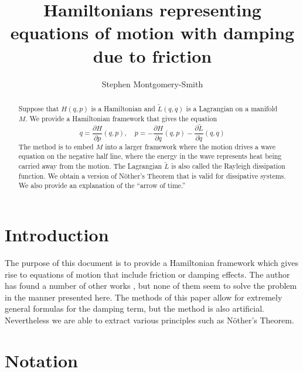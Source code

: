 \documentclass{amsart}
\title[]{Hamiltonians representing equations of motion with damping due to friction}
\author{Stephen Montgomery-Smith}
\begin{document}
\begin{abstract}
Suppose that $H(q,p)$ is a Hamiltonian and $\tilde L(q,\dot q)$ is a Lagrangian on a manifold $M$.  We provide a Hamiltonian framework that gives the equation
\begin{equation*}
\dot q = \frac{\partial H}{\partial p}(q,p) , \quad
\dot p = - \frac{\partial H}{\partial q}(q,p) - \frac{\partial \tilde L}{\partial \dot q}(q,\dot q)
\end{equation*}
The method is to embed $M$ into a larger framework where the motion drives a wave equation on the negative half line, where the energy in the wave represents heat being carried away from the motion.  The Lagrangian $\tilde L$ is also called the Rayleigh dissipation function.  We obtain a version of N\"other's Theorem that is valid for dissipative systems.  We also provide an explanation of the ``arrow of time.''
\end{abstract}

\maketitle

\section{Introduction}

The purpose of this document is to provide a Hamiltonian framework which gives rise to equations of motion that include friction or damping effects.  The author has found a number of other works \cite{bruneau,chandrasekar,froelich,koopman,rabei,riewe1,riewe2,smith,yu,zmoginov}, but none of them seem to solve the problem in the manner presented here.  The methods of this paper allow for extremely general formulas for the damping term, but the method is also artificial.  Nevertheless we are able to extract various principles such as N\"other's Theorem.

\section{Notation}
\end{document}
